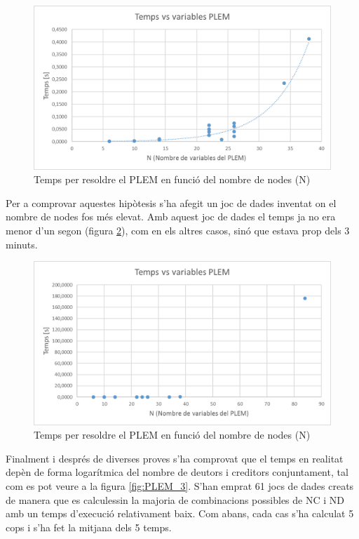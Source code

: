 \begin{figure}[ht]
\centering
\includegraphics[scale=0.8]{PLEM_temps_2.png}
\caption{Temps per resoldre el PLEM en funció del nombre de nodes (N)}\label{fig:PLEM_1}
\end{figure}

Per a comprovar aquestes hipòtesis s'ha afegit un joc de dades inventat on el nombre de nodes fos més elevat. Amb aquest joc de dades el temps ja no era menor d'un segon (figura \ref{fig:PLEM_2}), com en els altres casos, sinó que estava prop dels 3 minuts. 

\begin{figure}[ht]
\centering
\includegraphics[scale=0.8]{PLEM_temps_1.png}
\caption{Temps per resoldre el PLEM en funció del nombre de nodes (N)}\label{fig:PLEM_2}
\end{figure}

Finalment i després de diverses proves s'ha comprovat que el temps en realitat depèn de forma logarítmica del nombre de deutors i creditors conjuntament, tal com es pot veure a la figura \ref{fig:PLEM_3}. S'han emprat 61 jocs de dades creats de manera que es calculessin la majoria de combinacions possibles de NC i ND amb un temps d'execució relativament baix. Com abans, cada cas s'ha calculat 5 cops i s'ha fet la mitjana dels 5 temps.

